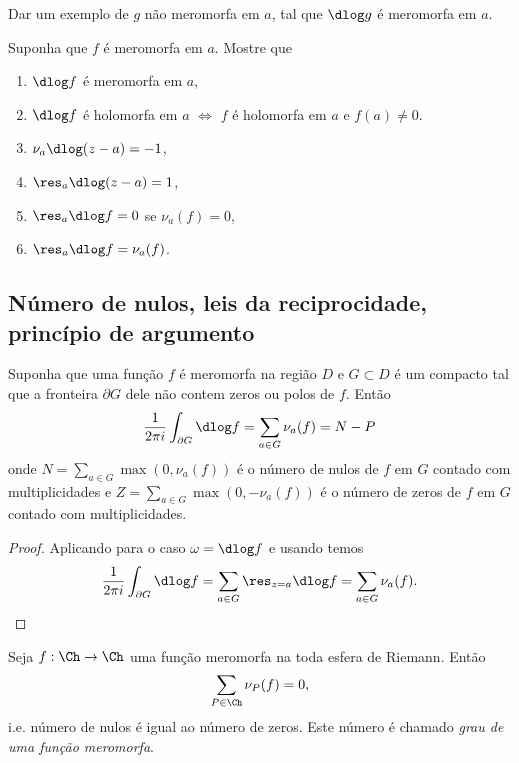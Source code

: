 \begin{problema}
\label{p:dlog}
Dar um exemplo de $g$ não meromorfa em $a$, tal que $\dlog g$ é meromorfa em $a$.

Suponha que $f$ é meromorfa em $a$. Mostre que
\begin{enumerate}
\item $\dlog f$ é meromorfa em $a$,
\item $\dlog f$ é holomorfa em $a$ $\iff$ $f$ é holomorfa em $a$ e $f(a)\neq 0$.
\item $\nu_a \dlog(z-a) = -1$,
\item $\res_a \dlog(z-a) = 1$,
\item $\res_a \dlog f = 0$ se $\nu_a(f) = 0$,
\item $\res_a \dlog f = \nu_a(f)$.
\end{enumerate}
\end{problema}

\subsection{Número de nulos, leis da reciprocidade, princípio de argumento}

\begin{teorema}
\label{t:dlog-val}
Suponha que uma função $f$ é meromorfa na região $D$ e $G\subset D$
é um compacto tal que a fronteira $\partial G$ dele não contem zeros ou polos de $f$. Então
\begin{equation}
\label{eq:dlog-val}
\frac{1}{2\pi i} \int_{\partial G} \dlog f = \sum_{a\in G} \nu_a(f) = N-P
\end{equation}
onde $N = \sum_{a\in G} \max(0,\nu_a(f))$ é o número de nulos de $f$ em $G$ contado com multiplicidades
e $Z = \sum_{a\in G} \max(0,-\nu_a(f))$ é o número de zeros de $f$ em $G$ contado com multiplicidades.
\end{teorema}
\begin{proof}
Aplicando  para o caso $\omega = \dlog f$ e usando  temos
\[ \frac{1}{2\pi i} \int_{\partial G} \dlog f = \sum_{a\in G} \res_{z=a} \dlog f = \sum_{a\in G} \nu_a(f). \]
\end{proof}

\begin{cor}
\label{reciprocidade-valoracoes}
Seja $f : \Ch \to \Ch$ uma função meromorfa na toda esfera de Riemann. Então
\begin{equation}
\label{eq:reciprocidade-valoracoes}
\sum_{P\in\Ch} \nu_P(f) = 0,
\end{equation}
i.e. número de nulos é igual ao número de zeros. Este número é chamado \emph{grau de uma função meromorfa}.
\end{cor}

